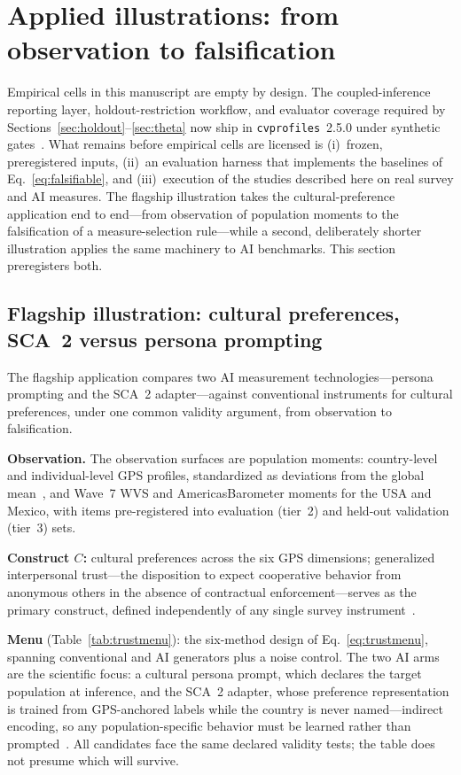 \documentclass[10pt,letterpaper]{article}
\newcommand{\cvp}{\texttt{cvprofiles}}
\begin{document}
\section{Applied illustrations: from observation to falsification}
\label{sec:plan}
Empirical cells in this manuscript are empty by design.
The coupled-inference reporting layer, holdout-restriction workflow, and evaluator coverage required by Sections~\ref{sec:holdout}--\ref{sec:theta} now ship in \cvp{}~2.5.0 under synthetic gates~\cite{cvprofiles}.
What remains before empirical cells are licensed is (i)~frozen, preregistered inputs, (ii)~an evaluation harness that implements the baselines of Eq.~\eqref{eq:falsifiable}, and (iii)~execution of the studies described here on real survey and AI measures.
The flagship illustration takes the cultural-preference application end to end---from observation of population moments to the falsification of a measure-selection rule---while a second, deliberately shorter illustration applies the same machinery to AI benchmarks.
This section preregisters both.

\subsection{Flagship illustration: cultural preferences, SCA~2 versus persona prompting}
The flagship application compares two AI measurement technologies---persona prompting and the SCA~2 adapter---against conventional instruments for cultural preferences, under one common validity argument, from observation to falsification.

\textbf{Observation.} The observation surfaces are population moments: country-level and individual-level GPS profiles, standardized as deviations from the global mean~\cite{falk2018}, and Wave~7 WVS and AmericasBarometer moments for the USA and Mexico, with items pre-registered into evaluation (tier~2) and held-out validation (tier~3) sets.

\textbf{Construct $C$:} cultural preferences across the six GPS dimensions; generalized interpersonal trust---the disposition to expect cooperative behavior from anonymous others in the absence of contractual enforcement---serves as the primary construct, defined independently of any single survey instrument~\cite{glaeser2000,sapienza2013,butler2016}.

\textbf{Menu} (Table~\ref{tab:trustmenu}): the six-method design of Eq.~\eqref{eq:trustmenu}, spanning conventional and AI generators plus a noise control.
The two AI arms are the scientific focus: a cultural persona prompt, which declares the target population at inference, and the SCA~2 adapter, whose preference representation is trained from GPS-anchored labels while the country is never named---indirect encoding, so any population-specific behavior must be learned rather than prompted~\cite{capra2025}.
All candidates face the same declared validity tests; the table does not presume which will survive.
\end{document}
